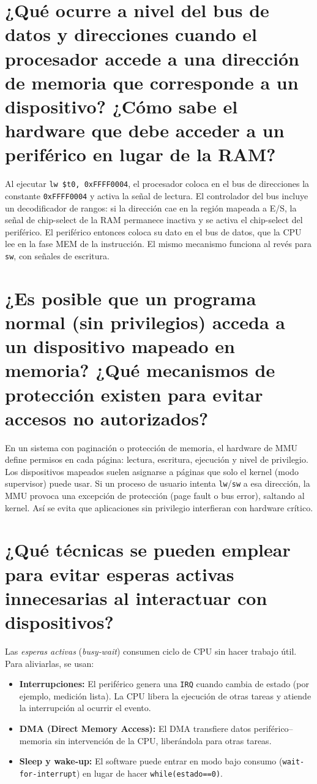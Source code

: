 \documentclass{article}
\begin{document}
\section{¿Qué ocurre a nivel del bus de datos y direcciones cuando el procesador accede a una dirección de memoria que corresponde a un dispositivo? ¿Cómo sabe el hardware que debe acceder a un periférico en lugar de la RAM?}

Al ejecutar \texttt{lw \$t0, 0xFFFF0004}, el procesador coloca en el bus de direcciones la constante \texttt{0xFFFF0004} y activa la señal de lectura. El controlador del bus incluye un decodificador de rangos: si la dirección cae en la región mapeada a E/S, la señal de chip-select de la RAM permanece inactiva y se activa el chip-select del periférico. El periférico entonces coloca su dato en el bus de datos, que la CPU lee en la fase MEM de la instrucción. El mismo mecanismo funciona al revés para \texttt{sw}, con señales de escritura.

\section{¿Es posible que un programa normal (sin privilegios) acceda a un dispositivo mapeado en memoria? ¿Qué mecanismos de protección existen para evitar accesos no autorizados?}

En un sistema con paginación o protección de memoria, el hardware de MMU define permisos en cada página: lectura, escritura, ejecución y nivel de privilegio. Los dispositivos mapeados suelen asignarse a páginas que solo el kernel (modo supervisor) puede usar. Si un proceso de usuario intenta \texttt{lw}/\texttt{sw} a esa dirección, la MMU provoca una excepción de protección (page fault o bus error), saltando al kernel. Así se evita que aplicaciones sin privilegio interfieran con hardware crítico.

\section{¿Qué técnicas se pueden emplear para evitar esperas activas innecesarias al interactuar con dispositivos?}

Las \emph{esperas activas} (\emph{busy‑wait}) consumen ciclo de CPU sin hacer trabajo útil. Para aliviarlas, se usan:

\begin{itemize}
  \item \textbf{Interrupciones:} El periférico genera una \texttt{IRQ} cuando cambia de estado (por ejemplo, medición lista). La CPU libera la ejecución de otras tareas y atiende la interrupción al ocurrir el evento.  
  \item \textbf{DMA (Direct Memory Access):} El DMA transfiere datos periférico–memoria sin intervención de la CPU, liberándola para otras tareas.  
  \item \textbf{Sleep y wake‑up:} El software puede entrar en modo bajo consumo (\texttt{wait-for-interrupt}) en lugar de hacer \texttt{while(estado==0)}.  
\end{itemize}
\end{document}
